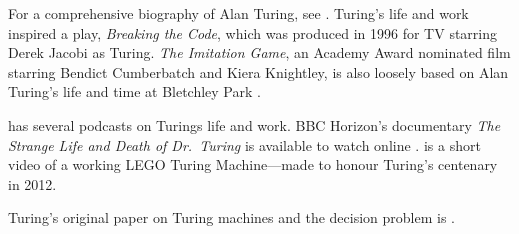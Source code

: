 \documentclass[../../../include/open-logic-section]{subfiles}
\begin{document}
\begin{reading}
For a comprehensive biography of Alan Turing, see \citet{Hodges2014}.
Turing's life and work inspired a play, \emph{Breaking the Code},
which was produced in 1996 for TV starring Derek Jacobi as
Turing. \emph{The Imitation Game}, an Academy Award nominated film
starring Bendict Cumberbatch and Kiera Knightley, is also loosely
based on Alan Turing’s life and time at Bletchley Park
\citet{Imitation2014}.

\citet{Radiolab2012} has several podcasts on Turings life and work.
BBC Horizon's documentary \emph{The Strange Life and Death of
  Dr.~Turing} is available to watch online \citep{Sykes1992}.
\citet{Theelen2012} is a short video of a working LEGO Turing
Machine---made to honour Turing's centenary in 2012.

Turing's original paper on Turing machines and the decision problem is
\citet{Turing1937}.
\end{reading}
\end{document}
